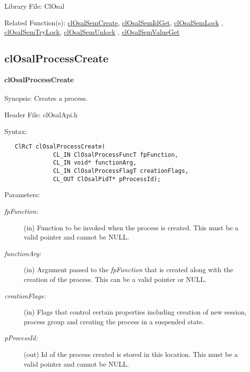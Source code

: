 \begin{Desc}
\item[Library File:]Cl\-Osal\end{Desc}
\begin{Desc}
\item[Related Function(s):]\hyperlink{pageosal132}{cl\-Osal\-Sem\-Create}, \hyperlink{pageosal133}{cl\-Osal\-Sem\-Id\-Get}, 
\hyperlink{pageosal134}{cl\-Osal\-Sem\-Lock} , \hyperlink{pageosal135}{cl\-Osal\-Sem\-Try\-Lock}, 
\hyperlink{pageosal136}{cl\-Osal\-Sem\-Unlock} , \hyperlink{pageosal137}{cl\-Osal\-Sem\-Value\-Get} \end{Desc}

\newpage
\subsection{clOsalProcessCreate}
\hypertarget{pageosal139}{}\paragraph{cl\-Osal\-Process\-Create}\label{pageosal139}
\begin{Desc}
\item[Synopsis:]Creates a process.\end{Desc}
\begin{Desc}
\item[Header File:]clOsalApi.h\end{Desc}
\begin{Desc}
\item[Syntax:]

\footnotesize\begin{verbatim}   ClRcT clOsalProcessCreate(
              CL_IN ClOsalProcessFuncT fpFunction,
              CL_IN void* functionArg,
              CL_IN ClOsalProcessFlagT creationFlags,
              CL_OUT ClOsalPidT* pProcessId);
\end{verbatim}
\normalsize
\end{Desc}
\begin{Desc}
\item[Parameters:]
\begin{description}
\item[{\em fp\-Function:}](in) Function to be invoked when the process is created. This must be a valid pointer and cannot be NULL.
\item[{\em function\-Arg:}](in) Argument passed to the {\em fp\-Function\/} that is created along with the creation of the process. This can be a 
valid pointer or NULL.\item[{\em creation\-Flags:}](in) Flags that control certain properties including creation of new session, process group and 
creating the process in a suspended state.\item[{\em p\-Process\-Id:}](out) Id of the process created is stored in this location. This must be a valid pointer and cannot be NULL.\end{description}
\end{Desc}
